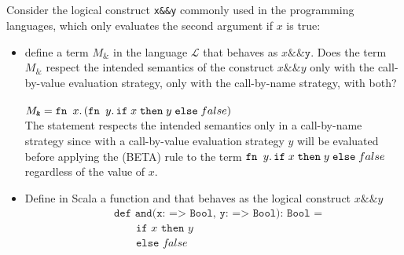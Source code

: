 \subsection{}

Consider the logical construct \texttt{x\&\&y} commonly used in the programming
languages, which only evaluates the second argument if $x$ is true:
\begin{itemize}
\item define a term $M_\texttt{\&}$ in the language $\mathcal{L}$ that
  behaves as $x\texttt{\&\&y}$. Does the term $M_\texttt{\&}$ respect
  the intended semantics of the construct $x\texttt{\&\&}y$ only with
  the call-by-value evaluation strategy, only with the call-by-name
  strategy, with both?\\~\\
  $M_\texttt{\&} = \texttt{fn }x.\,(\texttt{fn }y.\,\texttt{if}\;x\;\texttt{then}\;y\;\texttt{else}\;false)$\\
  The statement respects  the intended semantics only in a call-by-name
  strategy since with a call-by-value evaluation strategy $y$ will be
  evaluated before applying the (BETA) rule to the term
  $\texttt{fn }y.\,\texttt{if}\;x\;\texttt{then}\;y\;\texttt{else}\;false$ regardless of the value of $x$.
\item Define in Scala a function and that behaves as the logical construct
  $x\texttt{\&\&}y$
  \begin{align*}
    & \texttt{def and(x: => Bool, y: => Bool): Bool =} \\
    & \qquad\texttt{if }x\texttt{ then }y              \\
    & \qquad\texttt{else }false
  \end{align*}
\end{itemize}
